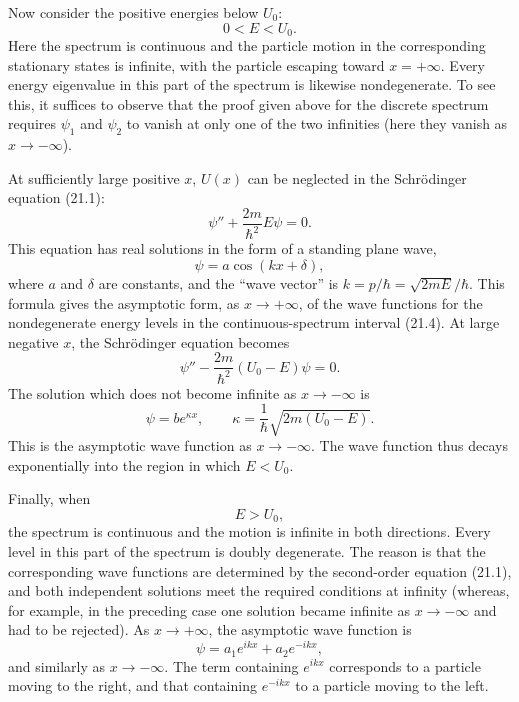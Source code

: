 Now consider the positive energies below $U_0$:
\begin{equation}
  0<E<U_0.
  \tag{21.4}
\end{equation}
Here the spectrum is continuous and the particle motion in the corresponding
stationary states is infinite, with the particle escaping toward
$x=+\infty$. Every energy eigenvalue in this part of the spectrum is likewise
nondegenerate. To see this, it suffices to observe that the proof given above
for the discrete spectrum requires $\psi_1$ and $\psi_2$ to vanish at only
one of the two infinities (here they vanish as $x\to-\infty$).

At sufficiently large positive $x$, $U(x)$ can be neglected in the
Schrödinger equation (21.1):
\[
  \psi''+\frac{2m}{\hbar^2}E\psi=0.
\]
This equation has real solutions in the form of a standing plane wave,
\begin{equation}
  \psi=a\cos(kx+\delta),
  \tag{21.5}
\end{equation}
where $a$ and $\delta$ are constants, and the ``wave vector'' is
$k=p/\hbar=\sqrt{2mE}/\hbar$. This formula gives the asymptotic form, as
$x\to+\infty$, of the wave functions for the nondegenerate energy levels in
the continuous-spectrum interval (21.4). At large negative $x$, the
Schrödinger equation becomes
\[
  \psi''-\frac{2m}{\hbar^2}(U_0-E)\psi=0.
\]
The solution which does not become infinite as $x\to-\infty$ is
\begin{equation}
  \psi=be^{\kappa x},
  \qquad
  \kappa=\frac{1}{\hbar}\sqrt{2m(U_0-E)}.
  \tag{21.6}
\end{equation}
This is the asymptotic wave function as $x\to-\infty$. The wave function thus
decays exponentially into the region in which $E<U_0$.

Finally, when
\begin{equation}
  E>U_0,
  \tag{21.7}
\end{equation}
the spectrum is continuous and the motion is infinite in both directions.
Every level in this part of the spectrum is doubly degenerate. The reason is
that the corresponding wave functions are determined by the second-order
equation (21.1), and both independent solutions meet the required conditions
at infinity (whereas, for example, in the preceding case one solution became
infinite as $x\to-\infty$ and had to be rejected). As $x\to+\infty$, the
asymptotic wave function is
\begin{equation}
  \psi=a_1e^{ikx}+a_2e^{-ikx},
  \tag{21.8}
\end{equation}
and similarly as $x\to-\infty$. The term containing $e^{ikx}$ corresponds to
a particle moving to the right, and that containing $e^{-ikx}$ to a particle
moving to the left.

